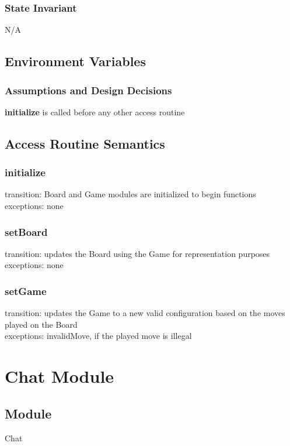 \documentclass[12pt, titlepage]{article}
\begin{document}
        \subsubsection*{State Invariant}
            N/A
            
    \subsection*{Environment Variables}
            
        \subsubsection*{Assumptions and Design Decisions}
            \textbf{initialize} is called before any other access routine
            
    \subsection*{Access Routine Semantics}
    \subsubsection*{initialize} 
            transition: Board and Game modules are initialized to begin functions\\
            exceptions: none
            
        \subsubsection*{setBoard} 
            transition: updates the Board using the Game for representation purposes\\
            exceptions: none
        
        \subsubsection*{setGame} 
            transition: updates the Game to a new valid configuration based on
            the moves played on the Board\\
            exceptions: invalidMove, if the played move is illegal

\newpage
\section*{Chat Module}
    \subsection*{Module}
        Chat
    
\end{document}
